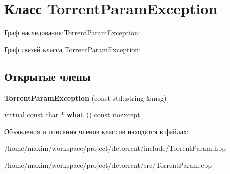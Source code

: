 \hypertarget{class_torrent_param_exception}{}\section{Класс Torrent\+Param\+Exception}
\label{class_torrent_param_exception}


Граф наследования\+:Torrent\+Param\+Exception\+:


Граф связей класса Torrent\+Param\+Exception\+:
\subsection*{Открытые члены}
\begin{DoxyCompactItemize}
\item 
\mbox{\label{class_torrent_param_exception_a96e240b0809c3c13375f70803641909f}} 
{\bfseries Torrent\+Param\+Exception} (const std\+::string \&msg)
\item 
\mbox{\label{class_torrent_param_exception_a91e212adfd98c4a999bc37f35e12930a}} 
virtual const char $\ast$ {\bfseries what} () const noexcept
\end{DoxyCompactItemize}


Объявления и описания членов классов находятся в файлах\+:\begin{DoxyCompactItemize}
\item 
/home/maxim/workspace/project/dctorrent/include/Torrent\+Param.\+hpp\item 
/home/maxim/workspace/project/dctorrent/src/Torrent\+Param.\+cpp\end{DoxyCompactItemize}
